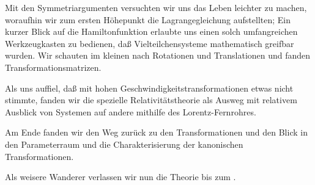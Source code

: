\documentclass[../WiSe22ANA3.tex]{subfiles}
\begin{document}
			Mit den Symmetriargumenten versuchten wir uns das Leben leichter zu machen, woraufhin wir zum ersten Höhepunkt die Lagrangegleichung aufstellten; Ein kurzer Blick auf die Hamiltonfunktion erlaubte uns einen solch umfangreichen Werkzeugkasten zu bedienen, daß Vielteilchensysteme mathematisch greifbar wurden. Wir schauten im kleinen nach Rotationen und Translationen und fanden Transformationsmatrizen.
			
			Als uns auffiel, daß mit hohen Geschwindigkeitstransformationen etwas nicht stimmte, fanden wir die spezielle Relativitätstheorie als Ausweg mit relativem Ausblick von Systemen auf andere mithilfe des Lorentz-Fernrohres. 
			
			Am Ende fanden wir den Weg zurück zu den Transformationen und den Blick in den Parameterraum und die Charakterisierung der kanonischen Transformationen. 
			
			Als weisere Wanderer verlassen wir nun die Theorie bis zum . 
\end{document}
